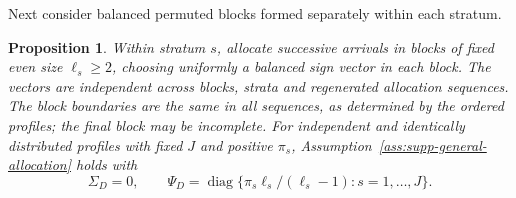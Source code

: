 \documentclass[12pt,a4paper]{article}
\newtheorem{proposition}{Proposition}
\theoremstyle{definition}
\theoremstyle{remark}\newtheorem{remark}{Remark}
\numberwithin{equation}{section}
\newcommand{\diag}{\operatorname{diag}}
\begin{document}
Next consider balanced permuted blocks formed separately within each stratum.
\begin{proposition}\label{prop:supp-blocks}
Within stratum $s$, allocate successive arrivals in blocks of fixed even size $\ell_s\ge2$, choosing uniformly a balanced sign vector in each block. The vectors are independent across blocks, strata and regenerated allocation sequences. The block boundaries are the same in all sequences, as determined by the ordered profiles; the final block may be incomplete. For independent and identically distributed profiles with fixed $J$ and positive $\pi_s$, Assumption~\ref{ass:supp-general-allocation} holds with
\begin{equation}\label{eq:supp-block-covariance}
 \Sigma_D=0,\qquad
 \Psi_D=\diag\{\pi_s\ell_s/(\ell_s-1):s=1,\ldots,J\}.
\end{equation}
\end{proposition}
\end{document}
